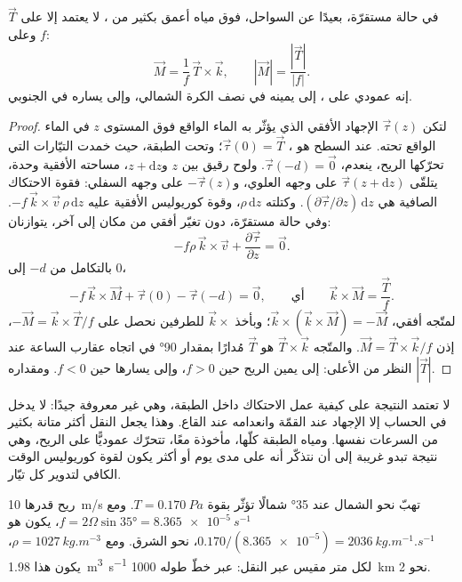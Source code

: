 \begin{theorem}\label{thm:b1:ocean-circulation:ekman}
في حالة مستقرّة، بعيدًا عن السواحل، فوق مياه أعمق بكثير من ، لا يعتمد  إلا على  $\vec T$ وعلى  $f$:
\[
  \vec M = \frac{1}{f}\,\vec T\times\vec k,
  \qquad |\vec M| = \frac{|\vec T|}{|f|}.
\]
إنه عمودي على ، إلى يمينه في نصف الكرة الشمالي، وإلى يساره في الجنوبي.
\end{theorem}

\begin{proof}
لتكن $\vec\tau(z)$ الإجهاد الأفقي الذي يؤثّر به الماء الواقع فوق المستوى $z$ في الماء الواقع تحته. عند السطح هو ، $\vec\tau(0) =
\vec T$؛ وتحت الطبقة، حيث خمدت التيّارات التي تحرّكها الريح، ينعدم، $\vec\tau(-d) = \vec 0$. ولوح رقيق بين $z$ و$z + \mathrm dz$، مساحته الأفقية وحدة، يتلقّى $\vec\tau(z + \mathrm dz)$ على وجهه العلوي، و$-\vec\tau(z)$ على وجهه السفلي: فقوة الاحتكاك الصافية هي $(\partial\vec
\tau/\partial z)\,\mathrm dz$. وكتلته $\rho\,\mathrm dz$، وقوة كوريوليس الأفقية عليه $-f\,\vec k\times\vec v\,\rho\,\mathrm dz$. وفي حالة مستقرّة، دون تغيّر أفقي من مكان إلى آخر، يتوازنان:
\[
  -f\rho\,\vec k\times\vec v + \frac{\partial\vec\tau}{\partial z} = \vec 0 .
\]
بالتكامل من $-d$ إلى $0$،
\[
  -f\,\vec k\times\vec M + \vec\tau(0) - \vec\tau(-d) = \vec 0,
  \qquad\text{أي}\qquad \vec k\times\vec M = \frac{\vec T}{f}.
\]
لمتّجه أفقي، $\vec k\times(\vec k\times\vec M) = -\vec M$؛ وبأخذ
$\vec k\times$ للطرفين نحصل على $-\vec M = \vec k\times\vec T/f$، إذن $\vec M =
\vec T\times\vec k/f$. والمتّجه $\vec T\times\vec k$ هو $\vec T$ مُدارًا بمقدار \ang{90} في اتجاه عقارب الساعة عند النظر من الأعلى: إلى يمين الريح حين $f > 0$، وإلى يسارها حين $f < 0$. ومقداره $|\vec T|$.
\end{proof}

لا تعتمد النتيجة على كيفية عمل الاحتكاك داخل الطبقة، وهي غير معروفة جيدًا: لا يدخل في الحساب إلا الإجهاد عند القمّة وانعدامه عند القاع. وهذا يجعل النقل أكثر متانة بكثير من السرعات نفسها. ومياه الطبقة كلّها، مأخوذة معًا، تتحرّك عموديًّا على الريح، وهي نتيجة تبدو غريبة إلى أن نتذكّر أنه على مدى يوم أو أكثر يكون لقوة كوريوليس الوقت الكافي لتدوير كل تيّار.

\begin{example}\label{ex:b1:ocean-circulation:transport}
ريح قدرها \qty{10}{m/s} تهبّ نحو الشمال عند \ang{35} شمالًا تؤثّر بقوة
$T = \qty{0.170}{Pa}$. ومع $f = 2\Omega\sin\ang{35} = \qty{8.365e-5}{s^{-1}}$، يكون  هو $0.170/(\num{8.365e-5}) = \qty{2036}{kg.m^{-1}.s^{-1}}$، نحو الشرق. ومع $\rho = \qty{1027}{kg.m^{-3}}$، يكون هذا \qty{1.98}{m^3.s^{-1}} لكل متر مقيس عبر النقل: عبر خطّ طوله \qty{1000}{km} نحو \qty{2}{\sverdrup}.
\end{example}

